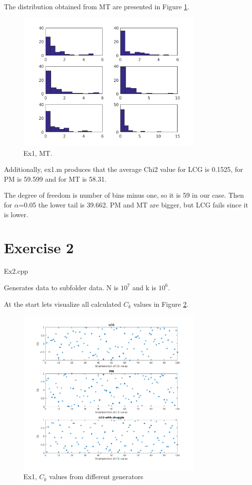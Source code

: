 \documentclass{article}
\begin{document}
The distribution obtained from MT are presented in Figure \ref{fig:ex1mt}.

\begin{figure}[!hbt]
	\includegraphics[width=350px]{"../Laskari2/ex1_mt"}
	\caption{Ex1, MT.}
	\label{fig:ex1mt}
\end{figure}

Additionally, ex1.m produces that the average Chi2 value for LCG is 0.1525, for PM is 59.599 and for MT is 58.31. 

The degree of freedom is number of bins minus one, so it is 59 in our case. Then for $\alpha$=0.05 the lower tail is 39.662. PM and MT are bigger, but LCG fails since it is lower.


%

\section*{Exercise 2}
Ex2.cpp

Generates data to subfolder data. N is $10^7$ and k is $10^6$.

At the start lets visualize all calculated $C_k$ values in Figure \ref{fig:ex2fig1}. 
\begin{figure}[!hbt]
	\includegraphics[width=350px]{"../Laskari2/ex2fig1"}
	\caption{Ex1, $C_k$ values from different generators}
	\label{fig:ex2fig1}
\end{figure}
\end{document}

